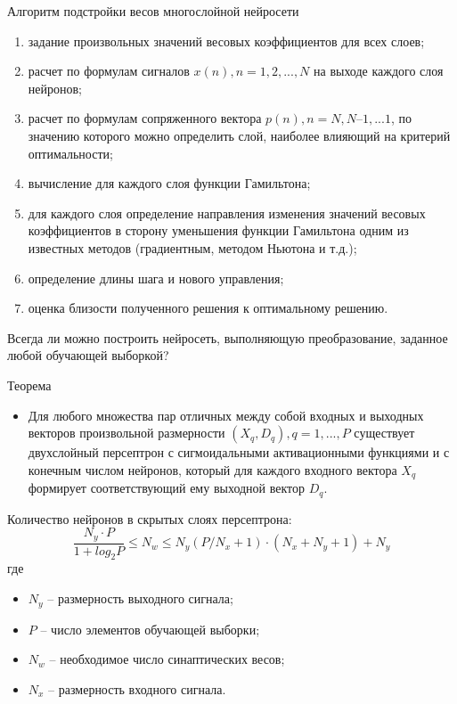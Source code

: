 \documentclass{beamer}
\begin{document}
\linespread{1.0}
\begin{frame}[t]{Алгоритм подстройки весов многослойной нейросети}
	\begin{enumerate}
		\item задание произвольных значений весовых коэффициентов для всех слоев;
		\item расчет по формулам сигналов $x(n), n=1,2,...,N$ на выходе каждого слоя нейронов;
		\item расчет по формулам сопряженного вектора $p(n), n = N, N–1,...1$, по значению которого можно определить слой, наиболее влияющий на критерий оптимальности;
		\item вычисление для каждого слоя функции Гамильтона;
		\item для каждого слоя определение направления изменения значений весовых коэффициентов в сторону уменьшения функции Гамильтона одним из известных методов (градиентным, методом Ньютона и т.д.);
		\item определение длины шага и нового управления;
		\item оценка близости полученного решения к оптимальному решению.
	\end{enumerate}
\end{frame}

\begin{frame}[t]
	Всегда ли можно построить нейросеть, выполняющую преобразование, заданное любой обучающей выборкой?
	\begin{block}{Теорема}
		\begin{itemize}		
			\item Для любого множества пар отличных между собой входных и выходных векторов произвольной размерности $(X_q, D_q), q = 1,...,P$ существует двухслойный персептрон с сигмоидальными активационными функциями и с конечным числом нейронов, который для каждого входного вектора $X_q$ формирует соответствующий ему  выходной вектор $D_q$. 
		\end{itemize}	
	\end{block}
	Количество нейронов в скрытых слоях персептрона:
	\[
		\frac{N_y\cdot P}{1+log_2P} \leq N_w \leq N_y(P/N_x+1)\cdot (N_x+N_y+1)+N_y
	\]
	где
	\begin{itemize}		
		\item $N_y$ -- размерность выходного сигнала; 
		\item $P$ -- число элементов обучающей выборки; 
		\item $N_w$ -- необходимое число синаптических весов; 
		\item $N_x$ -- размерность входного сигнала.
	\end{itemize}	
\end{frame}
\end{document}
